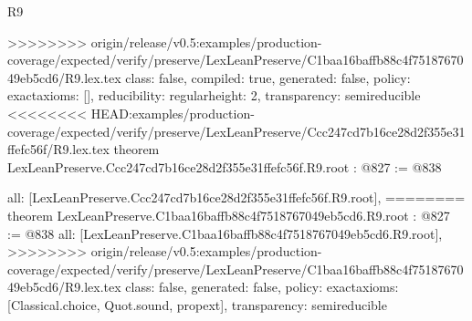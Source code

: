 \begin{lexlean}{R9}
\begin{coremodule}
{{{{{>>>>>>>> origin/release/v0.5:examples/production-coverage/expected/verify/preserve/LexLeanPreserve/C1baa16baffb88c4f7518767049eb5cd6/R9.lex.tex
  class: false,
  compiled: true,
  generated: false,
  policy: exact{axioms: []},
  reducibility: regular{height: 2},
  transparency: semireducible
}
<<<<<<<< HEAD:examples/production-coverage/expected/verify/preserve/LexLeanPreserve/Ccc247cd7b16ce28d2f355e31ffefc56f/R9.lex.tex
theorem LexLeanPreserve.Ccc247cd7b16ce28d2f355e31ffefc56f.R9.root : @827 := @838 {
  all: [LexLeanPreserve.Ccc247cd7b16ce28d2f355e31ffefc56f.R9.root],
========
theorem LexLeanPreserve.C1baa16baffb88c4f7518767049eb5cd6.R9.root : @827 := @838 {
  all: [LexLeanPreserve.C1baa16baffb88c4f7518767049eb5cd6.R9.root],
>>>>>>>> origin/release/v0.5:examples/production-coverage/expected/verify/preserve/LexLeanPreserve/C1baa16baffb88c4f7518767049eb5cd6/R9.lex.tex
  class: false,
  generated: false,
  policy: exact{axioms: [Classical.choice, Quot.sound, propext]},
  transparency: semireducible
}

}}}}}
\end{coremodule}
\end{lexlean}
